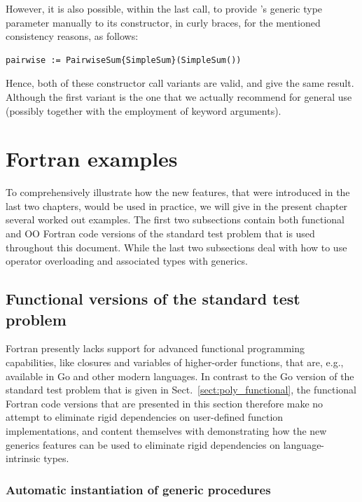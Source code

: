 \documentclass[11pt,oneside]{report}
\newcommand{\code}[1]{{\selectfont\ttfamily{#1}}}
\begin{document}
However, it is also possible, within the last call, to provide
\code{PairwiseSum}'s generic type parameter manually to its
constructor, in curly braces, for the mentioned consistency reasons,
as follows:
\begin{lstlisting}[language=LFortran,style=boxed]
  pairwise := PairwiseSum{SimpleSum}(SimpleSum())
\end{lstlisting}
Hence, both of these constructor call variants are valid, and give the
same result. Although the first variant is the one that we actually
recommend for general use (possibly together with the employment of
keyword arguments).


\chapter{Fortran examples}
\label{chapt:fortran_examples}

To comprehensively illustrate how the new features, that were
introduced in the last two chapters, would be used in practice, we will
give in the present chapter several worked out examples. The first two
subsections contain both functional and OO Fortran code versions of
the standard test problem that is used throughout this document. While
the last two subsections deal with how to use operator overloading and
associated types with generics.

\section{Functional versions of the standard test problem}

Fortran presently lacks support for advanced functional programming
capabilities, like closures and variables of higher-order functions,
that are, e.g., available in Go and other modern languages. In
contrast to the Go version of the standard test problem that is given
in Sect.~\ref{sect:poly_functional}, the functional Fortran code
versions that are presented in this section therefore make no attempt
to eliminate rigid dependencies on user-defined function
implementations, and content themselves with demonstrating how the new
generics features can be used to eliminate rigid dependencies on
language-intrinsic types.

\subsection{Automatic instantiation of generic procedures}
\end{document}
